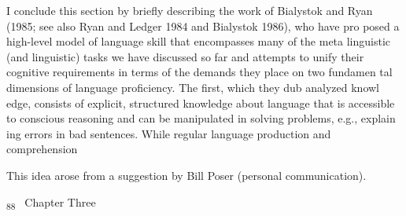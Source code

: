 \begin{styleTextbody}
I conclude this section by briefly describing the work of Bialystok and Ryan (1985; see also Ryan and Ledger 1984 and Bialystok 1986), who have pro\- posed a high-level model of language skill that encompasses many of the meta\- linguistic (and linguistic) tasks we have discussed so far and attempts to unify their cognitive requirements in terms of the demands they place on two fundamen\- tal dimensions of language proficiency. The first, which they dub analyzed knowl\- edge, consists of explicit, structured knowledge about language that is accessible to conscious reasoning and can be manipulated in solving problems, e.g., explain\- ing errors in bad sentences. While regular language production and comprehension
\end{styleTextbody}


\setcounter{listWWNumxlvleveli}{26}
\begin{listWWNumxlvleveli}
\item 
\begin{styleStandard}
This idea arose from a suggestion by Bill Poser (personal communication).
\end{styleStandard}


\end{listWWNumxlvleveli}
\clearpage\setcounter{page}{1}\begin{styleStandard}
\textsubscript{88\ \ }Chapter Three
\end{styleStandard}


